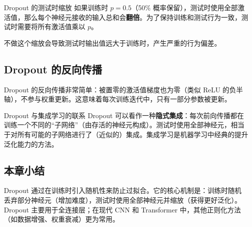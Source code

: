 \begin{warningbox}{Dropout 的测试时缩放}
如果训练时 $p = 0.5$（50\% 概率保留），测试时使用全部激活值，那么每个神经元接收的输入总和会\textbf{翻倍}。为了保持训练和测试行为一致，测试时需要将所有激活值乘以 $p$。

不做这个缩放会导致测试时输出值远大于训练时，产生严重的行为偏差。
\end{warningbox}

\subsection{Dropout 的反向传播}

Dropout 的反向传播非常简单：被置零的激活值梯度也为零（类似 ReLU 的负半轴），不参与权重更新。这意味着每次训练迭代中，只有一部分参数被更新。

\begin{knowledgebox}{Dropout 与集成学习的联系}
Dropout 可以看作一种\textbf{隐式集成}：每次前向传播都在训练一个不同的``子网络''（由存活的神经元构成）。测试时使用全部神经元，相当于对所有可能的子网络进行了（近似的）集成。集成学习是机器学习中经典的提升泛化能力的方法。
\end{knowledgebox}

\subsection{本章小结}

Dropout 通过在训练时引入随机性来防止过拟合。它的核心机制是：训练时随机丢弃部分神经元（增加难度），测试时使用全部神经元并缩放（获得更好泛化）。Dropout 主要用于全连接层；在现代 CNN 和 Transformer 中，其他正则化方法（如数据增强、权重衰减）更为常用。


